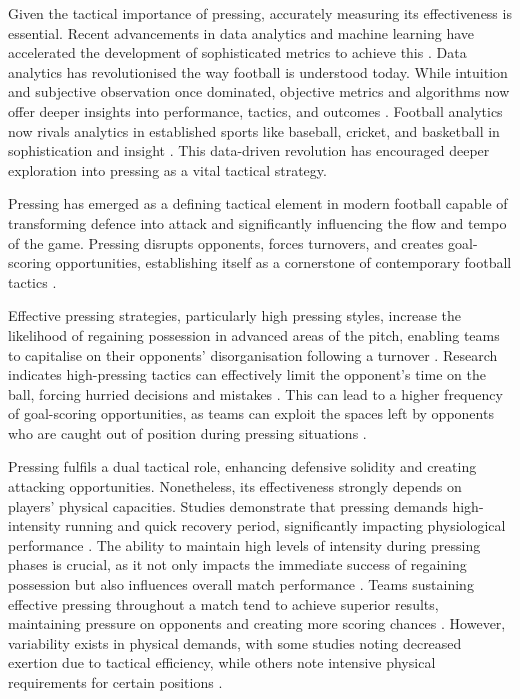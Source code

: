 \documentclass[12pt]{article}
\begin{document}
Given the tactical importance of pressing, accurately measuring its effectiveness is essential. Recent advancements in data analytics and machine learning have accelerated the development of sophisticated metrics to achieve this \citep{link_data_2018, memmert_data_2018, rein_big_2016, rico-gonzalez_markel_machine_2023}. Data analytics has revolutionised the way football is understood today. While intuition and subjective observation once dominated, objective metrics and algorithms now offer deeper insights into performance, tactics, and outcomes \citep{memmert_data_2018}. Football analytics now rivals analytics in established sports like baseball, cricket, and basketball in sophistication and insight \citep{herold_machine_2019, rico-gonzalez_markel_machine_2023}. This data-driven revolution has encouraged deeper exploration into pressing as a vital tactical strategy.

Pressing has emerged as a defining tactical element in modern football capable of transforming defence into attack and significantly influencing the flow and tempo of the game. Pressing disrupts opponents, forces turnovers, and creates goal-scoring opportunities, establishing itself as a cornerstone of contemporary football tactics \citep{robberechts_valuing_2019}.

Effective pressing strategies, particularly high pressing styles, increase the likelihood of regaining possession in advanced areas of the pitch, enabling teams to capitalise on their opponents' disorganisation following a turnover \citep{brindescu_study_2021, fernandez-navarro_evaluating_2019, modric_influence_2023}. Research indicates high-pressing tactics can effectively limit the opponent's time on the ball, forcing hurried decisions and mistakes \citep{forcher_is_2023, low_porous_2021}. This can lead to a higher frequency of goal-scoring opportunities, as teams can exploit the spaces left by opponents who are caught out of position during pressing situations \citep{cooper_impact_2020, fernandes_how_2020}.

Pressing fulfils a dual tactical role, enhancing defensive solidity and creating attacking opportunities. Nonetheless, its effectiveness strongly depends on players' physical capacities. Studies demonstrate that pressing demands high-intensity running and quick recovery period, significantly impacting physiological performance \citep{bortnik_mean_2022, ju_contextualised_2023}. The ability to maintain high levels of intensity during pressing phases is crucial, as it not only impacts the immediate success of regaining possession but also influences overall match performance \citep{carr_differences_2020, fernandez-navarro_evaluating_2019}. Teams sustaining effective pressing throughout a match tend to achieve superior results, maintaining pressure on opponents and creating more scoring chances \citep{liu_characterization_2024, modric_influence_2023}. However, variability exists in physical demands, with some studies noting decreased exertion due to tactical efficiency, while others note intensive physical requirements for certain positions \citep{low_exploring_2018, carr_differences_2020}.
\end{document}
